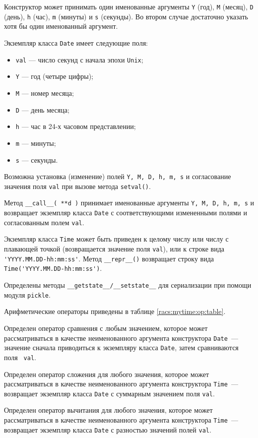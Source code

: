 Конструктор может принимать один
именованные аргументы {\tt Y} (год), {\tt M} (месяц), {\tt D} (день), {\tt h}
(час), {\tt m} (минуты) и {\tt s} (секунды). 
Во втором случае достаточно указать хотя бы один именованный аргумент. 

Экземпляр класса {\tt Date} имеет следующие поля:
\begin{itemize}
\item \verb'val' --- число секунд с начала эпохи {\tt Unix};
\item \verb'Y' --- год (четыре цифры);
\item \verb'M' --- номер месяца;
\item \verb'D' --- день месяца;
\item \verb'h' --- час в 24-х часовом представлении;
\item \verb'm' --- минуты;
\item \verb's' --- секунды.
\end{itemize}
Возможна установка (изменение) полей {\tt Y, M, D, h, m, s} и согласование значения
поля {\tt val} при вызове метода {\tt setval()}.

Метод {\tt \_\_call\_\_( **d )} принимает именованные аргументы {\tt Y, M, D, h, m, s}
и возвращает экземпляр класса {\tt Date} с соответствующими измененными полями
и согласованным полем {\tt val}.

Экземпляр класса {\tt Time} может быть приведен к целому числу или числу с
плавающей точкой (возвращается значение поля {\tt val}), или к строке
вида \verb|'YYYY.MM.DD-hh:mm:ss'|. Метод {\tt \_\_repr\_\_()} возвращает строку вида
\verb|Time('YYYY.MM.DD-hh:mm:ss')|.

Определены методы {\tt \_\_getstate\_\_/\_\_setstate\_\_} для сериализации при
помощи модуля {\tt pickle}. 

Арифметические операторы приведены в таблице \ref{racs:mytime:op:table}.

Определен оператор сравнения с любым значением, которое может рассматриваться
в качестве неименованного аргумента конструктора {\tt Date}~--- значение сначала
приводиться к экземпляру класса {\tt Date}, затем сравниваются поля {\tt
  val}. 

Определен оператор сложения для любого значения, которое может рассматриваться
в качестве неименованного аргумента конструктора {\tt Time}~--- возвращает
экземпляр класса {\tt Date} с суммарным значением поля {\tt val}. 

Определен оператор вычитания для любого значения, которое может рассматриваться
в качестве неименованного аргумента конструктора {\tt Time}~--- возвращает
экземпляр класса {\tt Date} с разностью значений полей {\tt val}. 

